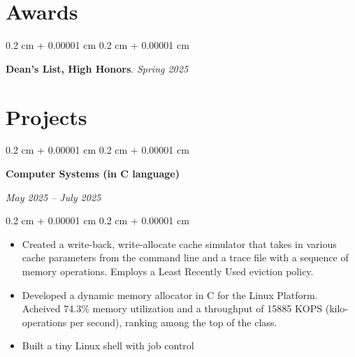 \documentclass[10pt, letterpaper]{article}
\newenvironment{highlights}{
    \begin{itemize}[
        topsep=0.10 cm,
        parsep=0.10 cm,
        partopsep=0pt,
        itemsep=0pt,
        leftmargin=0.4 cm + 10pt
    ]
}{
    \end{itemize}
} %
\newenvironment{onecolentry}{
    \begin{adjustwidth}{
        0.2 cm + 0.00001 cm
    }{
        0.2 cm + 0.00001 cm
    }
}{
    \end{adjustwidth}
} %
\newenvironment{twocolentry}[2][]{
    \onecolentry
    \def\secondColumn{#2}
    \setcolumnwidth{\fill, 4.5 cm}
    \begin{paracol}{2}
}{
    \switchcolumn \raggedleft \secondColumn
    \end{paracol}
    \endonecolentry
} %
\begin{document}
    \section{Awards}
        \begin{onecolentry}
            \textbf{Dean's List, High Honors}. \emph{Spring 2025}
        \end{onecolentry}
    \section{Projects}
        \begin{twocolentry}{
        \textit{May 2025 – July 2025}}
            \textbf{Computer Systems (in C language)}
        \end{twocolentry}

        \vspace{0.10 cm}
        \begin{onecolentry}
            \begin{highlights}
                \item Created a write-back, write-allocate cache simulator that takes in various cache parameters from the command line and a trace file with a sequence of memory operations. Employs a Least Recently Used eviction policy.
                \item Developed a dynamic memory allocator in C for the Linux Platform. Acheived 74.3\% memory utilization and a throughput of 15885 KOPS (kilo-operations per second), ranking among the top of the class.
                \item Built a tiny Linux shell with job control
            \end{highlights}
        \end{onecolentry}


    \vspace{0.20 cm}

    

    
\end{document}
